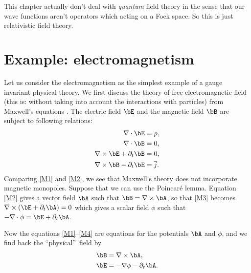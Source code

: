 
This chapter actually don't deal with \emph{quantum} field theory in the sense that our wave functions aren't operators which acting on a Fock space. So this is just relativistic field theory. 

\section{Example: electromagnetism}

Let us consider the electromagnetism as the simplest example of a gauge invariant physical theory. We first discuss the theory of free electromagnetic field (this is: without taking into account the interactions with particles) from Maxwell's equations \cite{Schomblond_em,llf}. The electric field $\bE$ and the magnetic field $\bB$ are subject to following relations:
\begin{subequations}
\begin{align}
\nabla\cdot{\bE}&=\rho,    \label{M1}\\
\nabla\cdot{\bB}&=0,                     \label{M2}  \\
\nabla\times{\bE}+\partial_t{\bB}&=0,         \label{M3}\\
\nabla\times{\bB}-\partial_t{\bE}&=\overline{ j }. \label{M4}
\end{align}
\end{subequations}
Comparing \eqref{M1} and \eqref{M2}, we see that Maxwell's theory does not incorporate magnetic monopoles.
Suppose that we can use the Poincaré lemma. Equation \eqref{M2} gives a vector field $\bA$ such that $\bB=\nabla\times\bA$, so that \eqref{M3} becomes $\nabla\times(\bE+\partial_t\bA)=0$ which gives a scalar field $\phi$ such that $-\nabla\cdot\phi=\bE+\partial_t\bA$.

Now the equations \eqref{M1}--\eqref{M4} are equations for the potentials $\bA$ and $\phi$, and we find back the ``physical''\ field by
\begin{subequations}\label{BE_de_A}
\begin{align}
    \bB&=\nabla\times\bA,\\
    \bE&=-\nabla\phi-\partial_t\bA.
\end{align}
\end{subequations}

